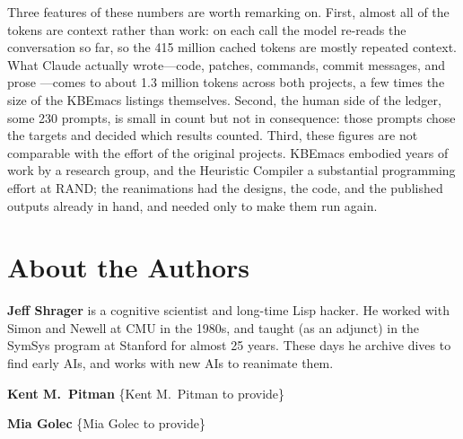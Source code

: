 \documentclass[11pt]{article}
\begin{document}
Three features of these numbers are worth remarking on. First, almost
all of the tokens are context rather than work: on each call the model
re-reads the conversation so far, so the 415 million cached tokens are
mostly repeated context. What Claude
actually wrote---code, patches, commands, commit messages, and prose
---comes to about 1.3 million tokens across both projects, a
few times the size of the KBEmacs listings themselves. Second, the
human side of the ledger, some 230 prompts, is small in count but not
in consequence: those prompts chose the targets and decided which
results counted. Third, these figures are not comparable with the
effort of the original projects. KBEmacs embodied
years of work by a research group, and the Heuristic Compiler a
substantial programming effort at RAND; the reanimations had the
designs, the code, and the published outputs already in hand, and
needed only to make them run again.


\section*{About the Authors}

\noindent\textbf{Jeff Shrager} is a cognitive scientist and long-time Lisp hacker. He worked with Simon and Newell at CMU in the 1980s, and taught (as an adjunct) in the SymSys program at Stanford for almost 25 years. These days he archive dives to find early AIs, and works with new AIs to reanimate them.

\noindent\textbf{Kent M.~Pitman} \{Kent M.~Pitman to provide\}

\noindent\textbf{Mia Golec} \{Mia Golec to provide\}
\end{document}
